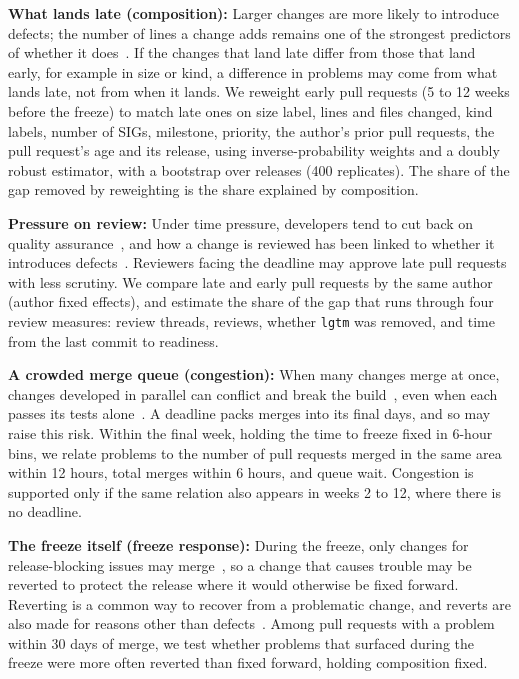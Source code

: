 \documentclass[10pt,conference]{IEEEtran}
\begin{document}
\textbf{What lands late (composition):} Larger changes are more likely to introduce defects; the number of lines a change adds remains one of the strongest predictors of whether it does~\cite{kamei2013jit,zeng2021deep}. If the changes that land late differ from those that land early, for example in size or kind, a difference in problems may come from what lands late, not from when it lands. We reweight early pull requests (5 to 12 weeks before the freeze) to match late ones on size label, lines and files changed, kind labels, number of SIGs, milestone, priority, the author's prior pull requests, the pull request's age and its release, using inverse-probability weights and a doubly robust estimator, with a bootstrap over releases (400 replicates). The share of the gap removed by reweighting is the share explained by composition.

\textbf{Pressure on review:} Under time pressure, developers tend to cut back on quality assurance~\cite{kuutila2020time}, and how a change is reviewed has been linked to whether it introduces defects~\cite{mcintosh2014review,thongtanunam2021review}. Reviewers facing the deadline may approve late pull requests with less scrutiny. We compare late and early pull requests by the same author (author fixed effects), and estimate the share of the gap that runs through four review measures: review threads, reviews, whether \texttt{lgtm} was removed, and time from the last commit to readiness.

\textbf{A crowded merge queue (congestion):} When many changes merge at once, changes developed in parallel can conflict and break the build~\cite{dasilva2022build}, even when each passes its tests alone~\cite{ananthanarayanan2019keeping}. A deadline packs merges into its final days, and so may raise this risk. Within the final week, holding the time to freeze fixed in 6-hour bins, we relate problems to the number of pull requests merged in the same area within 12 hours, total merges within 6 hours, and queue wait. Congestion is supported only if the same relation also appears in weeks 2 to 12, where there is no deadline.

\textbf{The freeze itself (freeze response):} During the freeze, only changes for release-blocking issues may merge~\cite{k8sphases}, so a change that causes trouble may be reverted to protect the release where it would otherwise be fixed forward. Reverting is a common way to recover from a problematic change, and reverts are also made for reasons other than defects~\cite{shimagaki2016reverted,yan2019reverted}. Among pull requests with a problem within 30 days of merge, we test whether problems that surfaced during the freeze were more often reverted than fixed forward, holding composition fixed.
\end{document}
